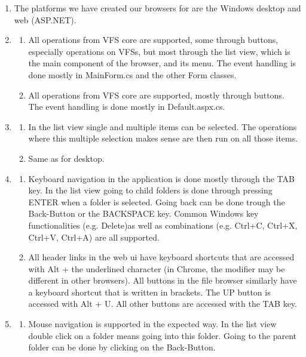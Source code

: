 \documentclass[a4paper,12pt]{article}
\begin{document}
\begin{enumerate}
	\item The platforms we have created our browsers for are the Windows desktop and web (ASP.NET).
	\item
		\begin{enumerate} [label={(\alph*)}]
		\item All operations from VFS core are supported, some through buttons, especially operations on VFSs, but most through the list view, which is the main component of the browser, and its menu. The event handling is done mostly in MainForm.cs and the other Form classes.
		\item All operations from VFS core are supported, mostly through buttons. The event handling is done mostly in\newline
		Default.aspx.cs.
		\end{enumerate}
	\item
		\begin{enumerate} [label={(\alph*)}]
		\item In the list view single and multiple items can be selected. The operations where this multiple selection makes sense are then run on all those items.
		\item Same as for desktop.
		\end{enumerate}
	\item
		\begin{enumerate} [label={(\alph*)}]
		\item Keyboard navigation in the application is done mostly through the TAB key. In the list view going to child folders is done through pressing ENTER when a folder is selected. Going back can be done trough the Back-Button or the BACKSPACE key. Common Windows key functionalities (e.g. Delete)as well as combinations (e.g. Ctrl+C, Ctrl+X, Ctrl+V, Ctrl+A) are all supported.
		\item All header links in the web ui have keyboard shortcuts that are accessed with Alt + the underlined character (in Chrome, the modifier may be different in other browsers). All buttons in the file browser similarly have a keyboard shortcut that is written in brackets. The UP button is accessed with Alt + U. All other buttons are accessed with the TAB key.
		\end{enumerate}
	\item
		\begin{enumerate} [label={(\alph*)}]
		\item Mouse navigation is supported in the expected way. In the list view double click on a folder means going into this folder. Going to the parent folder can be done by clicking on the Back-Button.

\end{enumerate}
\end{enumerate}
\end{document}
